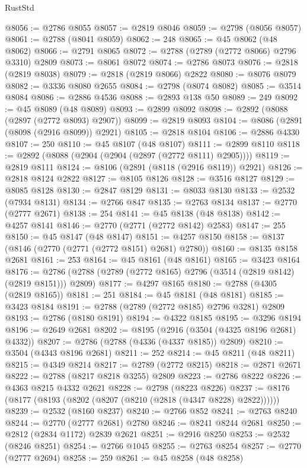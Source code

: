 \begin{lexlean}{RustStd}
\begin{coremodule}
@8056 := @2786 @8055
@8057 := @2819 @8046
@8059 := @2798 (@8056 @8057)
@8061 := @2788 (@8041 @8059)
@8062 := 248
@8065 := @45 @8062 (@48 @8062)
@8066 := @2791 @8065
@8072 := @2788 (@2789 (@2772 @8066) @2796 @3310) @2809
@8073 := @8061 @8072
@8074 := @2786 @8073
@8076 := @2818 (@2819 @8038)
@8079 := @2818 (@2819 @8066) @2822
@8080 := @8076 @8079
@8082 := @3336 @8080 @2655
@8084 := @2798 (@8074 @8082)
@8085 := @3514 @8084
@8086 := @2886 @4536
@8088 := @2893 @138 @50
@8089 := 249
@8092 := @45 @8089 (@48 @8089)
@8093 := @2899 @8092
@8098 := @2892 (@8088 (@2897 (@2772 @8093) @2907))
@8099 := @2819 @8093
@8104 := @8086 (@2891 (@8098 (@2916 @8099)) @2921)
@8105 := @2818 @8104
@8106 := @2886 @4330
@8107 := 250
@8110 := @45 @8107 (@48 @8107)
@8111 := @2899 @8110
@8118 := @2892 (@8088 (@2904 (@2904 (@2897 (@2772 @8111) @2905))))
@8119 := @2819 @8111
@8124 := @8106 (@2891 (@8118 (@2916 @8119)) @2921)
@8126 := @2818 @8124 @2822
@8127 := @8105 @8126
@8128 := @3516 @8127
@8129 := @8085 @8128
@8130 := @2847 @8129
@8131 := @8033 @8130
@8133 := @2532 (@7934 @8131)
@8134 := @2766 @847
@8135 := @2763 @8134
@8137 := @2770 (@2777 @2671)
@8138 := 254
@8141 := @45 @8138 (@48 @8138)
@8142 := @4257 @8141
@8146 := @2770 (@2771 (@2772 @8142) @2583)
@8147 := 255
@8150 := @45 @8147 (@48 @8147)
@8151 := @4257 @8150
@8158 := @8137 (@8146 (@2770 (@2771 (@2772 @8151) @2681) @2780))
@8160 := @8135 @8158 @2681
@8161 := 253
@8164 := @45 @8161 (@48 @8161)
@8165 := @3423 @8164
@8176 := @2786 (@2788 (@2789 (@2772 @8165) @2796 (@3514 (@2819 @8142) (@2819 @8151))) @2809)
@8177 := @4297 @8165
@8180 := @2788 (@4305 (@2819 @8165))
@8181 := 251
@8184 := @45 @8181 (@48 @8181)
@8185 := @3423 @8184
@8191 := @2788 (@2789 (@2772 @8185) @2796 @3281) @2809
@8193 := @2786 (@8180 @8191)
@8194 := @4322 @8185
@8195 := @3296 @8194
@8196 := @2649 @2681
@8202 := @8195 (@2916 (@3504 (@4325 @8196 @2681) @4332))
@8207 := @2786 (@2788 (@4336 (@4337 @8185)) @2809)
@8210 := @3504 (@4343 @8196 @2681)
@8211 := 252
@8214 := @45 @8211 (@48 @8211)
@8215 := @4349 @8214
@8217 := @2789 (@2772 @8215)
@8218 := @2871 @2671
@8222 := @2788 (@8217 @8218 @3255) @2809
@8223 := @2786 @8222
@8226 := @4363 @8215 @4332 @2621
@8228 := @2798 (@8223 @8226)
@8237 := @8176 (@8177 (@8193 (@8202 (@8207 (@8210 (@2818 (@4347 @8228) @2822))))))
@8239 := @2532 (@8160 @8237)
@8240 := @2766 @852
@8241 := @2763 @8240
@8244 := @2770 (@2777 @2681) @2780
@8246 := @8241 @8244 @2681
@8250 := @2812 (@2834 @1172) @2839 @2621
@8251 := @2916 @8250
@8253 := @2532 (@8246 @8251)
@8254 := @2766 @1045
@8255 := @2763 @8254
@8257 := @2770 (@2777 @2694)
@8258 := 259
@8261 := @45 @8258 (@48 @8258)

\end{coremodule}
\end{lexlean}
